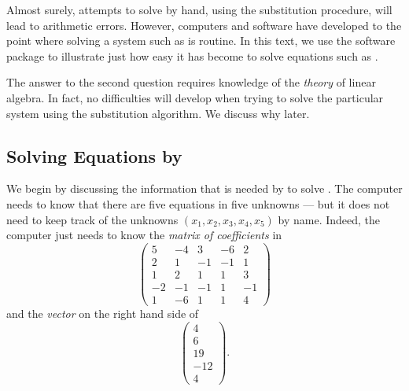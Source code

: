Almost surely, attempts to solve  by hand,
using the substitution procedure, will lead to arithmetic
errors.  However, computers and software have developed to the
point where solving a system such as  is routine.  In
this text, we use the software package \Matlab to illustrate
just how easy it has become to solve equations such as .

The answer to the second question requires knowledge of the
{\em theory\/} of linear algebra.  In fact, no difficulties will
develop when trying to solve the particular system 
using the substitution algorithm.  We discuss why later.

\subsection*{Solving Equations by \Matlab}

We begin by discussing the information that is needed by \Matlab
to solve .  The computer needs to know that there are
five equations in five unknowns --- but it does not need to keep
track of the unknowns $(x_1,x_2,x_3,x_4,x_5)$ by name.  Indeed,
the computer just needs to know the {\em matrix of
coefficients\/}  in 
\begin{equation*}  \label{bigmatrix}
\left(
\begin{array}{rrrrr}
 5 & -4 &  3 & -6 &  2 \\
 2 &  1 & -1 & -1 &  1 \\
 1 &  2 &  1 &  1 &  3 \\
-2 & -1 & -1 &  1 & -1 \\
 1 & -6 &  1 &  1 &  4
\end{array}
\right)
\end{equation*}
and the {\em vector\/} on the right hand side of 
\begin{equation*} \label{bigRHS}
\left(
\begin{array}{r}
  4 \\
  6 \\
 19 \\
-12 \\
  4
\end{array}
\right).
\end{equation*}

